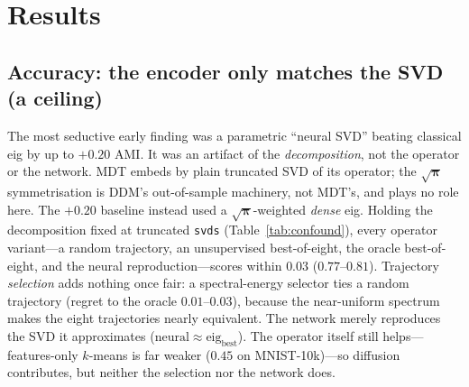 \documentclass[10pt,twocolumn]{article}
\newcommand{\bp}{\boldsymbol{\pi}}
\begin{document}
\section{Results}

\subsection{Accuracy: the encoder only matches the SVD (a ceiling)}
The most seductive early finding was a parametric ``neural SVD'' beating classical eig by up to
$+0.20$ AMI. It was an artifact of the \emph{decomposition}, not the operator or the network. MDT
embeds by plain truncated SVD of its operator; the $\sqrt{\bp}$ symmetrisation is DDM's out-of-sample
machinery, not MDT's, and plays no role here. The $+0.20$ baseline instead used a $\sqrt{\bp}$-weighted
\emph{dense} eig. Holding the decomposition fixed at truncated \texttt{svds} (Table~\ref{tab:confound}),
every operator variant---a random trajectory, an unsupervised best-of-eight, the oracle best-of-eight,
and the neural reproduction---scores within $0.03$ ($0.77$--$0.81$). Trajectory \emph{selection} adds
nothing once fair: a spectral-energy selector ties a random trajectory (regret to the oracle
$0.01$--$0.03$), because the near-uniform spectrum makes the eight trajectories nearly equivalent. The
network merely reproduces the SVD it approximates ($\text{neural}\!\approx\!\text{eig}_{\text{best}}$).
The operator itself still helps---features-only $k$-means is far weaker ($0.45$ on MNIST-10k)---so
diffusion contributes, but neither the selection nor the network does.
\end{document}
